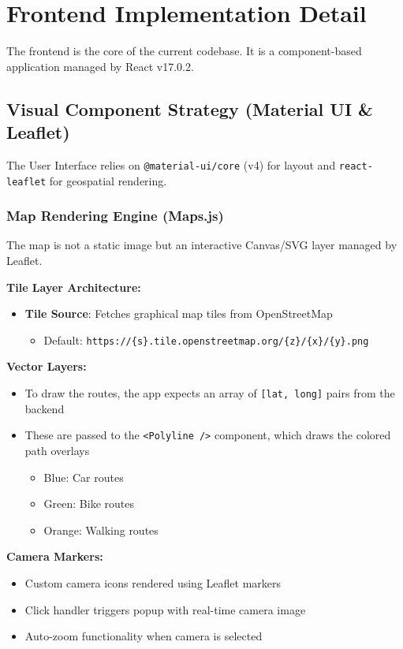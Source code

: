 \chapter{Frontend Implementation Detail}
\label{chap:features}

The frontend is the core of the current codebase. It is a component-based application managed by React v17.0.2.

\section{Visual Component Strategy (Material UI \& Leaflet)}

The User Interface relies on \texttt{@material-ui/core} (v4) for layout and \texttt{react-leaflet} for geospatial rendering.

\subsection{Map Rendering Engine (Maps.js)}

The map is not a static image but an interactive Canvas/SVG layer managed by Leaflet.

\textbf{Tile Layer Architecture:}
\begin{itemize}
    \item \textbf{Tile Source}: Fetches graphical map tiles from OpenStreetMap
    \begin{itemize}
        \item Default: \texttt{https://\{s\}.tile.openstreetmap.org/\{z\}/\{x\}/\{y\}.png}
    \end{itemize}
\end{itemize}

\textbf{Vector Layers:}
\begin{itemize}
    \item To draw the routes, the app expects an array of \texttt{[lat, long]} pairs from the backend
    \item These are passed to the \texttt{<Polyline />} component, which draws the colored path overlays
    \begin{itemize}
        \item Blue: Car routes
        \item Green: Bike routes
        \item Orange: Walking routes
    \end{itemize}
\end{itemize}

\textbf{Camera Markers:}
\begin{itemize}
    \item Custom camera icons rendered using Leaflet markers
    \item Click handler triggers popup with real-time camera image
    \item Auto-zoom functionality when camera is selected
\end{itemize}

